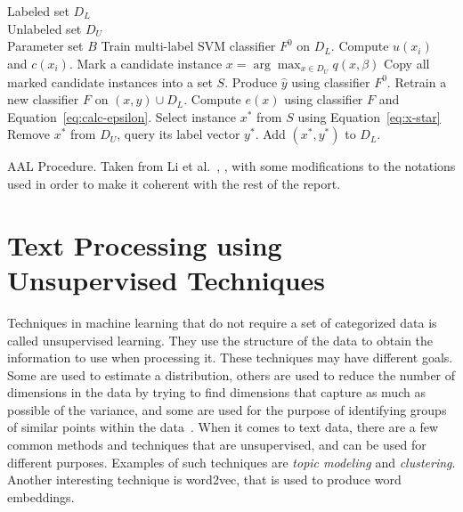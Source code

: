 \begin{algorithm}
    \begin{algorithmic}
        \REQUIRE Labeled set $D_L$ \\ 
                 Unlabeled set $D_U$ \\ 
                 Parameter set $B$
        \REPEAT
            \STATE Train multi-label SVM classifier $F^0$ on $D_L$.
                \STATE Compute $u(x_i)$ and $c(x_i)$.
            \ENDFOR
                \STATE Mark a candidate instance $x = \arg\max_{x \in D_U} q(x, \beta)$
            \ENDFOR
            \STATE Copy all marked candidate instances into a set $S$.
                \STATE Produce $\hat{y}$ using classifier $F^0$.
                \STATE Retrain a new classifier $F$ on $(x, \hat{y}) \cup D_L$.
                \STATE Compute $e(x)$ using classifier $F$ and Equation~\ref{eq:calc-epsilon}.
            \ENDFOR
            \STATE Select instance $x^*$ from $S$ using Equation~\ref{eq:x-star}
            \STATE Remove $x^*$ from $D_U$, query its label vector $y^*$.
            \STATE Add $(x^*, y^*)$ to $D_L$.
    \end{algorithmic}

    \caption{AAL Procedure. Taken from Li et al\@.~\cite{li2013active}, , with some modifications to the notations used in order to make it coherent with the rest of the report.}
    \label{alg:adaptive-active-learning}
\end{algorithm}


\section{Text Processing using Unsupervised Techniques}

Techniques in machine learning that do not require a set of categorized data is called unsupervised learning.
They use the structure of the data to obtain the information to use when processing it.
These techniques may have different goals.
Some are used to estimate a distribution, others are used to reduce the number of dimensions in the data by trying to find dimensions that capture as much as possible of the variance, and some are used for the purpose of identifying groups of similar points within the data~\cite{bishop2006pattern}.
When it comes to text data, there are a few common methods and techniques that are unsupervised, and can be used for different purposes.
Examples of such techniques are \textit{topic modeling} and \textit{clustering}.
Another interesting technique is word2vec, that is used to produce word embeddings.

